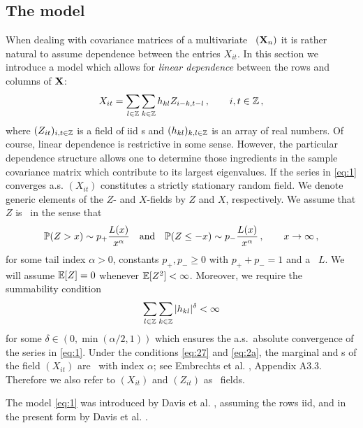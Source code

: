 \subsection{The model}
When dealing with covariance matrices of a multivariate \ts\ $({\mathbf X}_n)$ it is rather natural to assume dependence
between the entries $X_{it}$.
In this section we introduce a model which allows for {\em linear dependence}
between the rows and columns of ${\mathbf X}$:
\begin{equation}\label{eq:1}
X_{it}=\sum_{l\in \mathbb{Z}}\sum_{k\in \mathbb{Z}} h_{kl} Z_{i-k,t-l}\,,\qquad i,t\in\mathbb{Z}\,,
\end{equation}
where $(Z_{it})_{i,t\in \mathbb{Z}}$ is a field of iid \rv s and $(h_{kl})_{k,l\in\mathbb{Z}}$ is an array of real numbers.
Of course, linear dependence is restrictive in some sense. However, the particular dependence structure allows one to
determine those ingredients in the sample covariance matrix which contribute to its largest eigenvalues.
If the series in \eqref{eq:1} converges a.s. $(X_{it})$ constitutes a strictly stationary random field.
We denote generic elements of the $Z$- and $X$-fields by $Z$ and $X$, respectively. We assume that $Z$ is \regvary\ in the sense that
\begin{equation}\label{eq:27}
\mathbb{P}(Z>x)\sim p_+ \dfrac{L(x)}{x^{\alpha}}\quad\mbox{and}\quad  \mathbb{P}(Z\le -x)\sim p_-
\dfrac{L(x)}{x^{\alpha}}\,,\qquad x \to \infty\,,
\end{equation}
for some tail index $\alpha>0$, constants $p_+,p_-\ge 0$ with $p_++p_-=1$ and a \slvary\ $L$. We will assume $\mathbb{E}[ Z]=0$ whenever $\mathbb{E} [Z^2]<\infty$.
Moreover, we require the summability condition
\begin{equation}\label{eq:2a}
\sum_{l \in \mathbb{Z}} \sum_{k\in \mathbb{Z}} |h_{kl}|^{\delta} <\infty
\end{equation}
for some $\delta\in (0,\min({\alpha/2},1))$ which ensures
the a.s.~absolute convergence of the series in \eqref{eq:1}. Under the conditions \eqref{eq:27} and \eqref{eq:2a}, the marginal and
\fidi s of the field $(X_{it})$ are \regvary\ with index $\alpha$; see
Embrechts et al. \cite{embrechts:kluppelberg:mikosch:1997}, Appendix A3.3. Therefore we also refer to $(X_{it})$ and $(Z_{it})$
as \regvary\ fields.
\par
The model \eqref{eq:1} was introduced by Davis et al. \cite{davis:pfaffel:stelzer:2014}, assuming the rows iid, and in the
present form by Davis et al. \cite{davis:mikosch:pfaffel:2015}.
